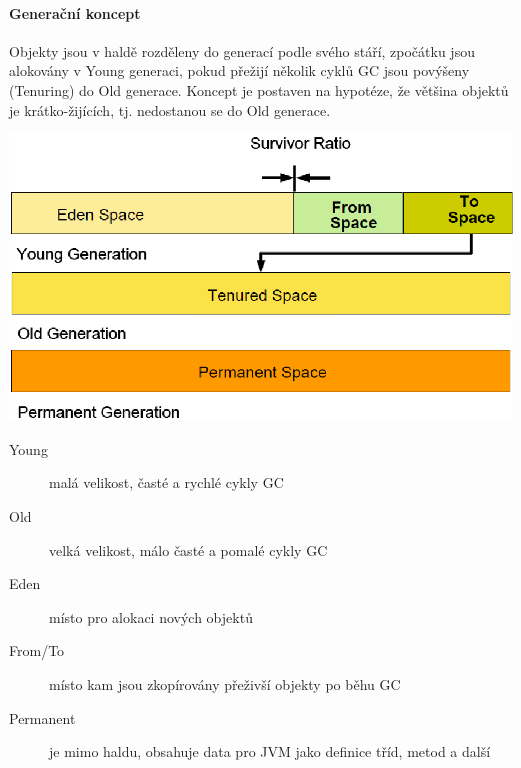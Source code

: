 \documentclass{scrreprt}
\begin{document}
\paragraph*{Generační koncept}
Objekty jsou v haldě rozděleny do generací podle svého stáří, zpočátku jsou alokovány v Young generaci, pokud přežijí několik cyklů GC jsou povýšeny (Tenuring) do Old generace. Koncept je postaven na hypotéze, že většina objektů je krátko-žijících, tj. nedostanou se do Old generace.
\begin{center}
\includegraphics[scale=0.5]{img/jvm_generations}
\end{center}
\begin{description}
\item[Young] malá velikost, časté a rychlé cykly GC
\item[Old] velká velikost, málo časté a pomalé cykly GC
\item[Eden] místo pro alokaci nových objektů
\item[From/To] místo kam jsou zkopírovány přeživší objekty po běhu GC
\item[Permanent] je mimo haldu, obsahuje data pro JVM jako definice tříd, metod a další
\end{description}
\end{document}
